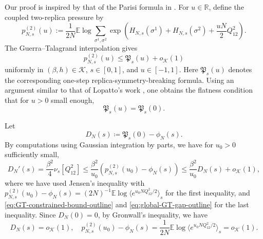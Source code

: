 \documentclass[11pt]{article}
\numberwithin{equation}{section}
\newcommand{\1}{\mathbf 1}
\newcommand{\cK}{\mathcal K}
\begin{document}
Our proof is inspired by that of the Parisi formula in \cite{TalagrandParisi}. For $u \in \mathbb R$, define the coupled 
two-replica pressure by
\begin{equation}
 p^{(2)}_{N,s}(u )
  :=
 \frac1{2N}\mathbb{E}\log
 \sum_{\sigma^1,\sigma^2}
 \exp\left(
 H_{N,s}(\sigma^1)+H_{N,s}(\sigma^2)
 +\frac{u  N}{2}Q_{12}^2\right).
\label{eq:constrained-two-replica-pressure}
\end{equation}
The Guerra--Talagrand interpolation gives
\begin{equation}
p_{N,s}^{(2)}(u )
\le
\mathfrak P_s(u )+ o_\cK(1)
\label{eq:GT-constrained-bound-outline}
\end{equation}
uniformly in $(\beta,h)\in\mathcal K$, $s\in[0,1]$, and
$u\in[-1,1]$. Here $\mathfrak P_s(u )$ denotes the
corresponding one-step replica-symmetry-breaking formula. Using an argument similar to that of Lopatto's  work \cite{Lopatto},  one obtains the flatness condition that for $u>0$ small enough,
 \begin{equation}
\mathfrak P_s(u )
= \mathfrak P_s(0). %
\label{eq:global-GT-gap-outline}
\end{equation}

Let \begin{equation*}
 D_N(s)\coloneqq \mathfrak P_s(0)-\phi_N(s).
\end{equation*} 
By computations using Gaussian integration by parts, we have for $u_0>0$ sufficiently small,  
\[
D_N'(s) =  \frac{\beta^2}{4} \nu_s [Q_{12}^2]  \leq \frac{\beta^2}{u_0} ({p_{N,s}^{(2)}(u_0)-\phi_N(s)}) \leq   \frac{\beta^2}{u_0} D_N(s) +  o_\cK(1),
\]
where we have used Jensen's inequality with $p_{N,s}^{(2)}(u_0)-\phi_N(s)= (2N)^{-1}\mathbb E\log \langle e^{u_0 N Q_{12}^2/2} \rangle_s$ for the first inequality, and \eqref{eq:GT-constrained-bound-outline} and \eqref{eq:global-GT-gap-outline} for the last inequality. Since $D_N(0) = 0$, by Gronwall's inequality, we have
$$D_N(s) = o_\cK(1),\quad  p_{N,s}^{(2)}(u_0)-\phi_N(s)= \frac{1}{2N}\mathbb E\log \langle e^{u_0 N Q_{12}^2/2} \rangle_s = o_\cK(1).$$ 
\end{document}
